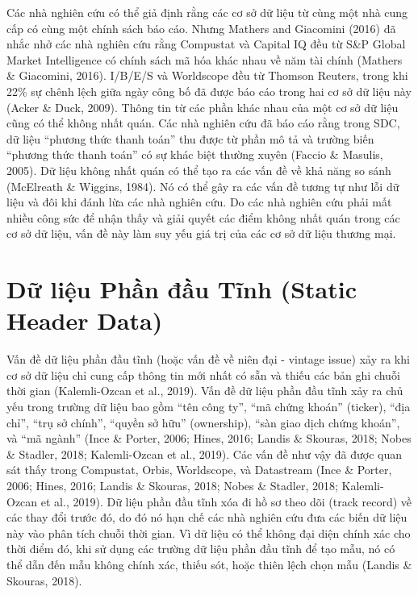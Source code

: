 Các nhà nghiên cứu có thể giả định rằng các cơ sở dữ liệu từ cùng một nhà cung cấp có cùng một chính sách báo cáo. Nhưng Mathers and Giacomini (2016) đã nhắc nhở các nhà nghiên cứu rằng Compustat và Capital IQ đều từ S\&P Global Market Intelligence có chính sách mã hóa khác nhau về năm tài chính (Mathers \& Giacomini, 2016). I/B/E/S và Worldscope đều từ Thomson Reuters, trong khi 22\% sự chênh lệch giữa ngày công bố đã được báo cáo trong hai cơ sở dữ liệu này (Acker \& Duck, 2009). Thông tin từ các phần khác nhau của một cơ sở dữ liệu cũng có thể không nhất quán. Các nhà nghiên cứu đã báo cáo rằng trong SDC, dữ liệu ``phương thức thanh toán'' thu được từ phần mô tả và trường biến ``phương thức thanh toán'' có sự khác biệt thường xuyên (Faccio \& Masulis, 2005). Dữ liệu không nhất quán có thể tạo ra các vấn đề về khả năng so sánh (McElreath \& Wiggins, 1984). Nó có thể gây ra các vấn đề tương tự như lỗi dữ liệu và đôi khi đánh lừa các nhà nghiên cứu. Do các nhà nghiên cứu phải mất nhiều công sức để nhận thấy và giải quyết các điểm không nhất quán trong các cơ sở dữ liệu, vấn đề này làm suy yếu giá trị của các cơ sở dữ liệu thương mại.

\section{Dữ liệu Phần đầu Tĩnh (Static Header Data)}

Vấn đề dữ liệu phần đầu tĩnh (hoặc vấn đề về niên đại - vintage issue) xảy ra khi cơ sở dữ liệu chỉ cung cấp thông tin mới nhất có sẵn và thiếu các bản ghi chuỗi thời gian (Kalemli-Ozcan et al., 2019). Vấn đề dữ liệu phần đầu tĩnh xảy ra chủ yếu trong trường dữ liệu bao gồm ``tên công ty'', ``mã chứng khoán'' (ticker), ``địa chỉ'', ``trụ sở chính'', ``quyền sở hữu'' (ownership), ``sàn giao dịch chứng khoán'', và ``mã ngành'' (Ince \& Porter, 2006; Hines, 2016; Landis \& Skouras, 2018; Nobes \& Stadler, 2018; Kalemli-Ozcan et al., 2019). Các vấn đề như vậy đã được quan sát thấy trong Compustat, Orbis, Worldscope, và Datastream (Ince \& Porter, 2006; Hines, 2016; Landis \& Skouras, 2018; Nobes \& Stadler, 2018; Kalemli-Ozcan et al., 2019). Dữ liệu phần đầu tĩnh xóa đi hồ sơ theo dõi (track record) về các thay đổi trước đó, do đó nó hạn chế các nhà nghiên cứu đưa các biến dữ liệu này vào phân tích chuỗi thời gian. Vì dữ liệu có thể không đại diện chính xác cho thời điểm đó, khi sử dụng các trường dữ liệu phần đầu tĩnh để tạo mẫu, nó có thể dẫn đến mẫu không chính xác, thiếu sót, hoặc thiên lệch chọn mẫu (Landis \& Skouras, 2018).

